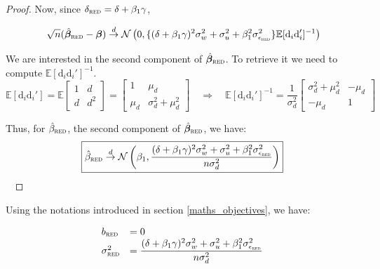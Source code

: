 \documentclass[a4paper, 11pt]{report}
\begin{document}
\begin{proof}
			Now, since $\delta_{\textsc{red}} = \delta + \beta_{1} \gamma$, 
			
			\[ \sqrt{n}(\hat{\bm{\beta}}_{\textsc{red}} - \bm{\beta}) \overset{d}{\to} 
					\mathcal{N}\left(0,  \{(\delta + \beta_{1} \gamma)^{2}\sigma_{w}^{2} + \sigma_{u}^{2} + \beta_{1}^{2}\sigma_{\epsilon_{\textsc{red}}}^{2}\} \mathbb{E}[\text{d}_{i}\text{d}_{i}']^{-1} \right) \]
				
			We are interested in the second component of $\hat{\bm{\beta}}_{\textsc{red}}$. To retrieve it we need to compute $\mathbb{E}[\text{d}_{i} \text{d}_{i}']^{-1}$.  
			~
			\[ 
				\mathbb{E}[\text{d}_{i}\text{d}_i'] 
				= \mathbb{E} \begin{bmatrix}
					1 & d\\ 
					d & d^{2}
				\end{bmatrix} 
				=
				\begin{bmatrix}
					1 & \mu_{d}\\ 
					\mu_{d} & \sigma_{d}^{2} + \mu_{d}^2
				\end{bmatrix} 
				\quad \Rightarrow \quad
				     \mathbb{E}[\text{d}_{i}\text{d}_i']^{-1} = 
				     		\dfrac{1}{\sigma_{d}^{2}} 
							\begin{bmatrix}
								 \sigma_{d}^{2} + \mu_{d}^2 & -\mu_{d}\\ 
								 -\mu_{d} & 1
							\end{bmatrix} 
				\]
				
				Thus, for $\hat{\beta}_{\textsc{red}}$, the second component of $\hat{\bm{\beta}}_{\textsc{red}}$, we have:
				~
				\begin{equation*}
					\boxed{
						\hat{\beta}_{\textsc{red}} \overset{d}{\to} 
							\mathcal{N}\left(\beta_{1},  \dfrac{(\delta + \beta_{1}\gamma)^{2} \sigma_{w}^{2} + \sigma_{u}^{2} + \beta_{1}^{2}\sigma_{\epsilon_{\textsc{red}}}^{2}}{n \sigma_{d}^{2}}  \right)
					}
				\end{equation*}
			~	
			\end{proof}
			
				Using the notations introduced in section \ref{maths_objectives}, we have:
				~
				
				\begin{equation}\label{b_sigma_red}
					\begin{array}{lll}
						b_{\textsc{red}} & = 0\\
					\sigma_{\textsc{red}}^{2} & =  \dfrac{(\delta + \beta_{1}\gamma)^{2} \sigma_{w}^{2} + \sigma_{u}^{2} + \beta_{1}^{2}\sigma_{\epsilon_{\textsc{red}}}^{2}}{n \sigma_{d}^{2}}
					\end{array}				
				\end{equation}
				
\end{document}
